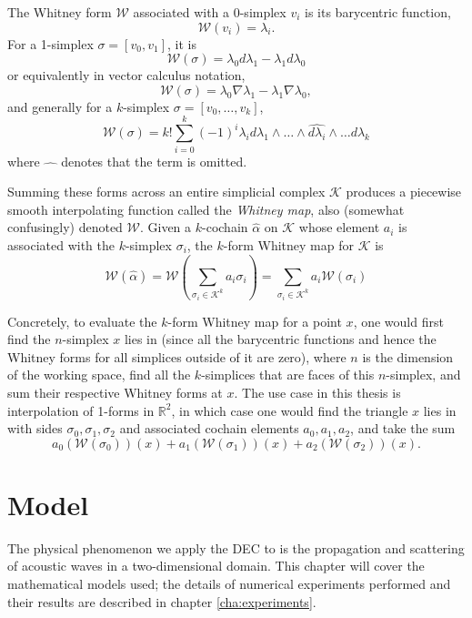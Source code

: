 \documentclass[utf8,english]{gradu3}
\begin{document}
The Whitney form $\mathcal{W}$ associated with a 0-simplex $v_i$
is its barycentric function,
\[
  \mathcal{W}(v_i) = \lambda_i.
\]
For a 1-simplex $\sigma = [v_0,v_1]$, it is
\[
  \mathcal{W}(\sigma) = \lambda_0 d\lambda_1 - \lambda_1 d\lambda_0
\]
or equivalently in vector calculus notation,
\[
  \mathcal{W}(\sigma) = \lambda_0 \nabla\lambda_1 - \lambda_1 \nabla\lambda_0,
\]
and generally for a $k$-simplex $\sigma = [v_0,\dots,v_k]$,
\begin{equation}
  \mathcal{W}(\sigma) = k! \sum_{i=0}^{k} (-1)^i
    \lambda_i d\lambda_1 \wedge \dots \wedge \widehat{d\lambda_i}
    \wedge \dots d\lambda_k
\end{equation}
where $\widehat{\quad}$ denotes that the term is omitted.

Summing these forms across an entire simplicial complex $\mathcal{K}$
produces a piecewise smooth interpolating function called the \textit{Whitney map},
also (somewhat confusingly) denoted $\mathcal{W}$.
Given a $k$-cochain $\hat{\alpha}$ on $\mathcal{K}$ whose element $a_i$
is associated with the $k$-simplex $\sigma_i$,
the $k$-form Whitney map for $\mathcal{K}$ is
\begin{equation}
  \mathcal{W}(\hat{\alpha})
  = \mathcal{W}(\sum_{\sigma_i \in \mathcal{K}^k} a_i\sigma_i)
  = \sum_{\sigma_i \in \mathcal{K}^k} a_i \mathcal{W}(\sigma_i)
\end{equation}

Concretely, to evaluate the $k$-form Whitney map for a point $x$,
one would first find the $n$-simplex $x$ lies in
(since all the barycentric functions and hence the Whitney forms
for all simplices outside of it are zero),
where $n$ is the dimension of the working space,
find all the $k$-simplices that are faces of this $n$-simplex,
and sum their respective Whitney forms at $x$.
The use case in this thesis is interpolation of 1-forms in $\mathbb{R}^2$,
in which case one would find the triangle $x$ lies in
with sides $\sigma_0,\sigma_1,\sigma_2$
and associated cochain elements $a_0,a_1,a_2$,
and take the sum
\[
  a_0 (\mathcal{W}(\sigma_0))(x)
  + a_1 (\mathcal{W}(\sigma_1))(x)
  + a_2 (\mathcal{W}(\sigma_2))(x).
\]


\chapter{Model}\label{cha:model}

The physical phenomenon we apply the DEC to
is the propagation and scattering of acoustic waves
in a two-dimensional domain.
This chapter will cover the mathematical models used;
the details of numerical experiments performed and their results
are described in chapter \ref{cha:experiments}.
\end{document}
